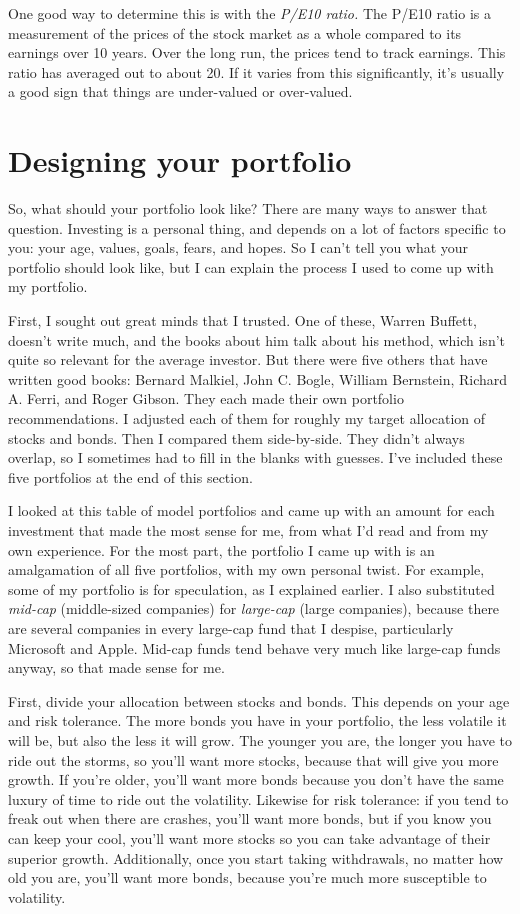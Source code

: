 One good way to determine this is with the \emph{P/E10 ratio.} The P/E10 ratio is a measurement of the prices of the stock market as a whole compared to its earnings over 10 years. Over the long run, the prices tend to track earnings. This ratio has averaged out to about 20. If it varies from this significantly, it's usually a good sign that things are under-valued or over-valued.

\section{Designing your portfolio}
So, what should your portfolio look like? There are many ways to answer that question. Investing is a personal thing, and depends on a lot of factors specific to you: your age, values, goals, fears, and hopes. So I can't tell you what your portfolio should look like, but I can explain the process I used to come up with my portfolio.

First, I sought out great minds that I trusted. One of these, Warren Buffett, doesn't write much, and the books about him talk about his method, which isn't quite so relevant for the average investor. But there were five others that have written good books: Bernard Malkiel, John C. Bogle, William Bernstein, Richard A. Ferri, and Roger Gibson. They each made their own portfolio recommendations. I adjusted each of them for roughly my target allocation of stocks and bonds. Then I compared them side-by-side. They didn't always overlap, so I sometimes had to fill in the blanks with guesses.  I've included these five portfolios at the end of this section.

I looked at this table of model portfolios and came up with an amount for each investment that made the most sense for me, from what I'd read and from my own experience. For the most part, the portfolio I came up with is an amalgamation of all five portfolios, with my own personal twist. For example, some of my portfolio is for speculation, as I explained earlier. I also substituted \emph{mid-cap} (middle-sized companies) for \emph{large-cap} (large companies), because there are several companies in every large-cap fund that I despise, particularly Microsoft and Apple. Mid-cap funds tend behave very much like large-cap funds anyway, so that made sense for me.

First, divide your allocation between stocks and bonds. This depends on your age and risk tolerance. The more bonds you have in your portfolio, the less volatile it will be, but also the less it will grow. The younger you are, the longer you have to ride out the storms, so you'll want more stocks, because that will give you more growth. If you're older, you'll want more bonds because you don't have the same luxury of time to ride out the volatility. Likewise for risk tolerance: if you tend to freak out when there are crashes, you'll want more bonds, but if you know you can keep your cool, you'll want more stocks so you can take advantage of their superior growth. Additionally, once you start taking withdrawals, no matter how old you are, you'll want more bonds, because you're much more susceptible to volatility.



